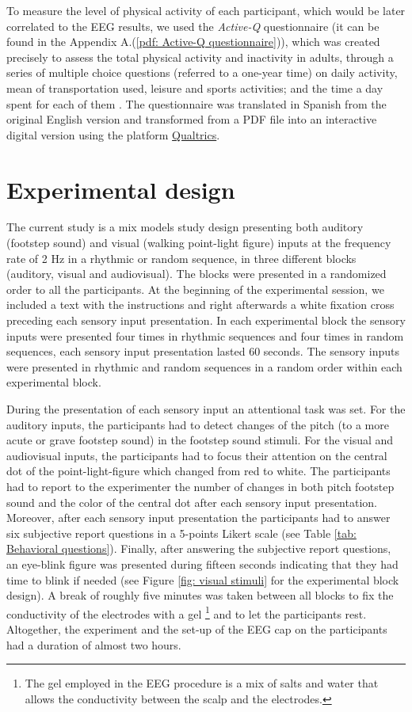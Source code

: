 To measure the level of physical activity of each participant, which would be later correlated to the EEG results, we used the \textit{Active-Q} questionnaire (it can be found in the Appendix A.(\ref{pdf: Active-Q questionnaire})), which was created precisely to assess the total physical activity and inactivity in adults, through a series of multiple choice questions (referred to a one-year time) on daily activity, mean of transportation used, leisure and sports activities; and the time a day spent for each of them \parencite{Bonn_2012}. 
The questionnaire was translated in Spanish from the original English version and transformed from a PDF file into an interactive digital version using the platform \href{https://www.qualtrics.com/uk/?rid=ip&prevsite=en&newsite=uk&geo=ES&geomatch=uk}{Qualtrics}. 

\section{Experimental design}
The current study is a mix models study design presenting both auditory (footstep sound) and visual (walking point-light figure) inputs at the frequency rate of 2 Hz in a rhythmic or random sequence, in three different blocks (auditory, visual and audiovisual). The blocks were presented in a randomized order to all the participants. 
At the beginning of the experimental session, we included a text with the instructions and right afterwards a white fixation cross preceding each sensory input presentation. 
In each experimental block the sensory inputs were presented four times in rhythmic sequences and four times in random sequences, each sensory input presentation lasted 60 seconds. The sensory inputs were presented in rhythmic and random sequences in a random order within each experimental block.  

During the presentation of each sensory input an attentional task was set. For the auditory inputs, the participants had to detect changes of the pitch (to a more acute or grave footstep sound) in the footstep sound stimuli. For the visual and audiovisual inputs, the participants had to focus their attention on the central dot of the point-light-figure which changed from red to white. The participants had to report to the experimenter the number of changes in both pitch footstep sound and the color of the central dot after each sensory input presentation.  
Moreover, after each sensory input presentation the participants had to answer six subjective report questions in a 5-points Likert scale (see Table \ref{tab: Behavioral questions}). Finally, after answering the subjective report questions, an eye-blink figure was presented during fifteen seconds indicating that they had time to blink if needed (see Figure \ref{fig: visual stimuli} for the experimental block design).  
A break of roughly five minutes was taken between all blocks to fix the conductivity of the electrodes with a gel \footnote{The gel employed in the EEG procedure is a mix of salts and water that allows the conductivity between the scalp and the electrodes.} and to let the participants rest. Altogether, the experiment and the set-up of the EEG cap on the participants had a duration of almost two hours.

